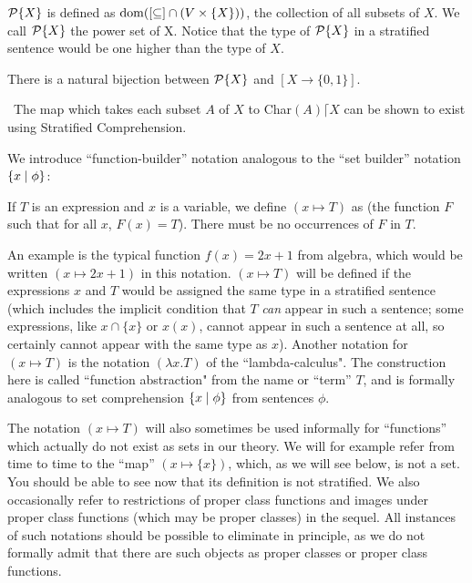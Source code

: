 \begin{definition}
 ${\cal P}\{X\}$ is defined as $\mathop{\mathrm{dom}}([\subseteq] \cap (V \times \{X\}))$, the
 collection of all subsets of $X$.  We call ${\cal P}\{X\}$ the {\upshape power
 set\/} of X.  Notice that the type of ${\cal P}\{X\}$ in a stratified sentence
 would be one higher than the type of $X$.
\end{definition}

\begin{thm}
 There is a natural bijection between ${\cal P}\{X\}$ and $[X
 \rightarrow  \{0,1\}]$.
\end{thm}

\preuve\ The map which takes each subset $A$ of $X$ to Char$(A)\lceil X$ can be
shown to exist using Stratified Comprehension.
\finpreuve

We introduce ``function-builder''
notation analogous to the ``set builder'' notation $\{x \mid \phi\}$:


\begin{definition}
 If $T$ is an expression and $x$ is a variable, we
 define $(x \mapsto T)$ as (the function $F$ such that for all $x$,
 $F(x)=T$).  There must be no occurrences of $F$ in $T$.
\end{definition}

An example is the typical function $f(x) = 2x+1$ from algebra,
which would be written $(x \mapsto 2x+1)$ in this notation.  $(x \mapsto T)$
will be defined if the expressions $x$ and $T$ would be assigned the
same type in a stratified
sentence (which includes the implicit 
condition that $T$ {\itshape can\/} appear in such a sentence; some
expressions, like $x \cap \{x\}$ or $x(x)$, cannot appear in such a
sentence at all, so certainly cannot appear with the same type as
$x$).  Another notation for $(x \mapsto T)$ is the notation $(\lambda
x.T)$ of the ``lambda-calculus".  The construction here is called
``function
abstraction" from the name or ``term'' $T$, and is formally 
analogous to set comprehension $\{x \mid \phi\}$ from
sentences $\phi$.

The notation $(x \mapsto T)$ will also sometimes be used informally
for ``functions'' which actually do not exist as sets in our theory.
We will for example refer from time to time to the ``map'' $(x \mapsto
\{x\})$, which, as we will see below, is not a set.  You should be
able to see now that its definition is not stratified.
We also occasionally refer to restrictions of proper class
functions and  images under proper class functions
(which may be proper classes) in the sequel.  All instances of such notations
should be possible to eliminate in principle, as we do not formally admit that
there are such objects as proper classes or proper class functions.

